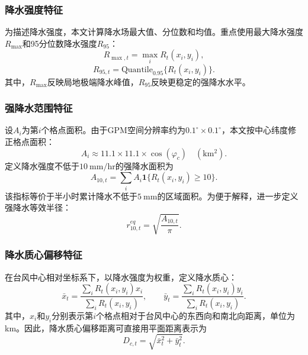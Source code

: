 \documentclass[UTF8,a4paper,zihao=5]{ctexart}
\numberwithin{equation}{section}
\numberwithin{figure}{section}
\numberwithin{table}{section}
\begin{document}
\subsubsection{降水强度特征}

为描述降水强度，本文计算降水场最大值、分位数和均值。重点使用最大降水强度$R_{\max}$和95分位数降水强度$R_{95}$：
\begin{equation}
    R_{\max,t}=\max_i R_t(x_i,y_i),
\end{equation}
\begin{equation}
    R_{95,t}=\mathrm{Quantile}_{0.95}\{R_t(x_i,y_i)\}.
\end{equation}
其中，$R_{\max}$反映局地极端降水峰值，$R_{95}$反映更稳定的强降水水平。

\subsubsection{强降水范围特征}

设$A_i$为第$i$个格点面积。由于GPM空间分辨率约为$0.1^\circ\times0.1^\circ$，本文按中心纬度修正格点面积：
\begin{equation}
    A_i \approx 11.1\times 11.1 \times \cos(\varphi_c)\quad(\mathrm{km^2}).
\end{equation}
定义降水强度不低于$10\ \mathrm{mm/hr}$的强降水面积为
\begin{equation}
    A_{10,t}=\sum_i A_i\mathbf{1}\{R_t(x_i,y_i)\geq 10\}.
\end{equation}
该指标等价于半小时累计降水不低于$5\ \mathrm{mm}$的区域面积。为便于解释，进一步定义强降水等效半径：
\begin{equation}
    r_{10,t}^{eq}=\sqrt{\frac{A_{10,t}}{\pi}}.
\end{equation}

\subsubsection{降水质心偏移特征}

在台风中心相对坐标系下，以降水强度为权重，定义降水质心：
\begin{equation}
    \bar{x}_t=\frac{\sum_i R_t(x_i,y_i)x_i}{\sum_i R_t(x_i,y_i)},\qquad
    \bar{y}_t=\frac{\sum_i R_t(x_i,y_i)y_i}{\sum_i R_t(x_i,y_i)}.
\end{equation}
其中，$x_i$和$y_i$分别表示第$i$个格点相对于台风中心的东西向和南北向距离，单位为km。因此，降水质心偏移距离可直接用平面距离表示为
\begin{equation}
    D_{c,t}=\sqrt{\bar{x}_t^2+\bar{y}_t^2}.
\end{equation}
\end{document}
